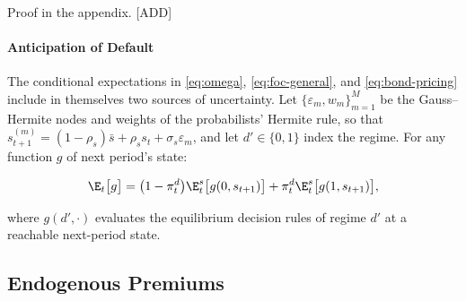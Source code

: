 \begin{proposition} 
\end{proposition}
Proof in the appendix. [ADD]




\paragraph{Anticipation of Default}

The conditional expectations in \eqref{eq:omega}, \eqref{eq:foc-general}, and 
\eqref{eq:bond-pricing} include in themselves two sources of uncertainty. Let
$\{\varepsilon_m,w_m\}_{m=1}^{M}$ be the Gauss--Hermite nodes and weights of the
probabilists' Hermite rule, so that $s_{t+1}^{(m)}=(1-\rho_s)\bar s+\rho_s s_t+\sigma_s\varepsilon_m$, and let
$d'\in\{0,1\}$ index the regime. For any function $g$ of next period's state:

\begin{equation}
\E_t\bigl[g\bigr] = \bigl(1-\pi^d_t\bigr) \E^s_t \bigl[g(0, s_{t+1})\bigr] + \pi^d_t \E^s_t \bigl[g(1, s_{t+1})\bigr],
\label{eq:expectation}
\end{equation}

where $g(d',\cdot)$ evaluates the equilibrium decision rules of regime $d'$ at a
reachable next-period state.

\subsection{Endogenous Premiums}

